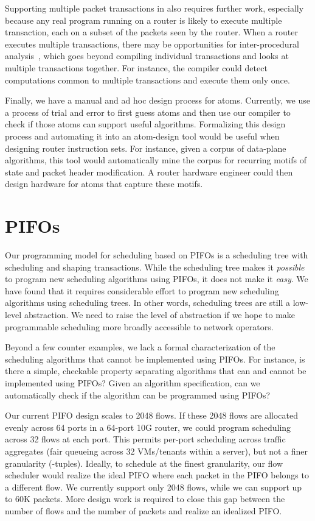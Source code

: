 Supporting multiple packet transactions in \pktlanguage also requires further
work, especially because any real program running on a router is likely to
execute multiple transaction, each on a subset of the packets seen by the
router. When a router executes multiple transactions, there may be
opportunities for inter-procedural analysis~\cite{dragonbook}, which goes
beyond compiling individual transactions and looks at multiple transactions
together.  For instance, the compiler could detect computations common to
multiple transactions and execute them only once.

Finally, we have a manual and ad hoc design process for atoms. Currently, we
use a process of trial and error to first guess atoms and then use our compiler
to check if those atoms can support useful algorithms.  Formalizing this design
process and automating it into an atom-design tool would be useful when
designing router instruction sets. For instance, given a corpus of data-plane
algorithms, this tool would automatically mine the corpus for recurring motifs
of state and packet header modification. A router hardware engineer could then
design hardware for atoms that capture these motifs.

\section{PIFOs}
\label{sec:pifo_limitations}

Our programming model for scheduling based on PIFOs is a scheduling tree with
scheduling and shaping transactions. While the scheduling tree makes it
\textit{possible} to program new scheduling algorithms using PIFOs, it does not
make it \textit{easy}. We have found that it requires considerable effort to
program new scheduling algorithms using scheduling trees.  In other words,
scheduling trees are still a low-level abstraction. We need to raise the level
of abstraction if we hope to make programmable scheduling more broadly
accessible to network operators.

Beyond a few counter examples, we lack a formal characterization of the
scheduling algorithms that cannot be implemented using PIFOs. For instance, is
there a simple, checkable property separating algorithms that can and cannot be
implemented using PIFOs? Given an algorithm specification, can we automatically
check if the algorithm can be programmed using PIFOs?

Our current PIFO design scales to 2048 flows. If these 2048 flows are allocated
evenly across 64 ports in a 64-port 10G router, we could program scheduling
across 32 flows at each port. This permits per-port scheduling across traffic
aggregates (\eg fair queueing across 32 VMs/tenants within a server), but not
a finer granularity (-tuples). Ideally, to schedule at the finest
granularity, our flow scheduler would realize the ideal PIFO where each packet
in the PIFO belongs to a different flow. We currently support only 2048 flows,
while we can support up to 60K packets.  More design work is required to close
this gap between the number of flows and the number of packets and realize an
idealized PIFO.


